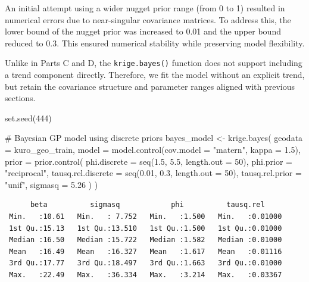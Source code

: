 \documentclass[
  11pt,
]{article}
\newenvironment{Shaded}{\begin{snugshade}}{\end{snugshade}}
\newcommand{\AttributeTok}[1]{\textcolor[rgb]{0.40,0.45,0.13}{#1}}
\newcommand{\CommentTok}[1]{\textcolor[rgb]{0.37,0.37,0.37}{#1}}
\newcommand{\DecValTok}[1]{\textcolor[rgb]{0.68,0.00,0.00}{#1}}
\newcommand{\FloatTok}[1]{\textcolor[rgb]{0.68,0.00,0.00}{#1}}
\newcommand{\FunctionTok}[1]{\textcolor[rgb]{0.28,0.35,0.67}{#1}}
\newcommand{\NormalTok}[1]{\textcolor[rgb]{0.00,0.23,0.31}{#1}}
\newcommand{\OtherTok}[1]{\textcolor[rgb]{0.00,0.23,0.31}{#1}}
\newcommand{\SpecialCharTok}[1]{\textcolor[rgb]{0.37,0.37,0.37}{#1}}
\newcommand{\StringTok}[1]{\textcolor[rgb]{0.13,0.47,0.30}{#1}}
\begin{document}
An initial attempt using a wider nugget prior range (from 0 to 1)
resulted in numerical errors due to near-singular covariance matrices.
To address this, the lower bound of the nugget prior was increased to
0.01 and the upper bound reduced to 0.3. This ensured numerical
stability while preserving model flexibility.

Unlike in Parts C and D, the \texttt{krige.bayes()} function does not
support including a trend component directly. Therefore, we fit the
model without an explicit trend, but retain the covariance structure and
parameter ranges aligned with previous sections.

\begin{Shaded}
\begin{Highlighting}[]
\FunctionTok{set.seed}\NormalTok{(}\DecValTok{444}\NormalTok{)}

\CommentTok{\# Bayesian GP model using discrete priors}
\NormalTok{bayes\_model }\OtherTok{\textless{}{-}} \FunctionTok{krige.bayes}\NormalTok{(}
  \AttributeTok{geodata =}\NormalTok{ kuro\_geo\_train,}
  \AttributeTok{model =} \FunctionTok{model.control}\NormalTok{(}\AttributeTok{cov.model =} \StringTok{"matern"}\NormalTok{, }\AttributeTok{kappa =} \FloatTok{1.5}\NormalTok{),}
  \AttributeTok{prior =} \FunctionTok{prior.control}\NormalTok{(}
    \AttributeTok{phi.discrete =} \FunctionTok{seq}\NormalTok{(}\FloatTok{1.5}\NormalTok{, }\FloatTok{5.5}\NormalTok{, }\AttributeTok{length.out =} \DecValTok{50}\NormalTok{),}
    \AttributeTok{phi.prior =} \StringTok{"reciprocal"}\NormalTok{,}
    \AttributeTok{tausq.rel.discrete =} \FunctionTok{seq}\NormalTok{(}\FloatTok{0.01}\NormalTok{, }\FloatTok{0.3}\NormalTok{, }\AttributeTok{length.out =} \DecValTok{50}\NormalTok{),}
    \AttributeTok{tausq.rel.prior =} \StringTok{"unif"}\NormalTok{,}
    \AttributeTok{sigmasq =} \FloatTok{5.26}
\NormalTok{  )}
\NormalTok{)}
\end{Highlighting}
\end{Shaded}

\begin{Shaded}
\end{Shaded}

\begin{verbatim}
      beta          sigmasq            phi          tausq.rel      
 Min.   :10.61   Min.   : 7.752   Min.   :1.500   Min.   :0.01000  
 1st Qu.:15.13   1st Qu.:13.510   1st Qu.:1.500   1st Qu.:0.01000  
 Median :16.50   Median :15.722   Median :1.582   Median :0.01000  
 Mean   :16.49   Mean   :16.327   Mean   :1.617   Mean   :0.01116  
 3rd Qu.:17.77   3rd Qu.:18.497   3rd Qu.:1.663   3rd Qu.:0.01000  
 Max.   :22.49   Max.   :36.334   Max.   :3.214   Max.   :0.03367  
\end{verbatim}
\end{document}
